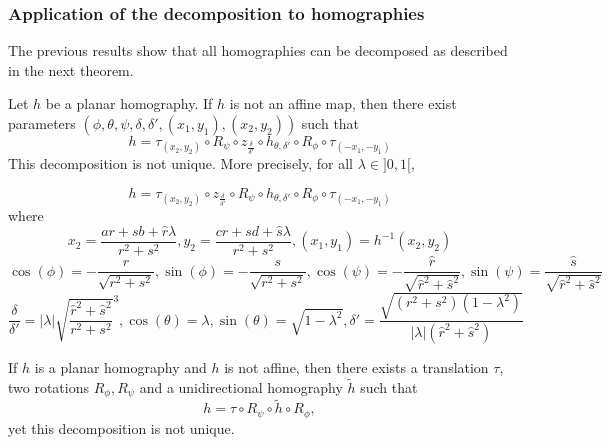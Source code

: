\subsubsection{Application of the decomposition to homographies}
The previous results show that all homographies can be decomposed as described in the next theorem.

\begin{thm}
Let $h$ be a planar homography. If $h$ is not an affine map, then there exist parameters $(\phi,\theta,\psi,\delta,\delta',(x_1,y_1),(x_2,y_2))$ such that
\begin{equation*}
h = \tau_{(x_2,y_2)} \circ R_{\psi} \circ z_{\frac{\delta}{\delta'}} \circ h_{\theta,\delta'} \circ R_{\phi} \circ \tau_{(-x_1,-y_1)}
\end{equation*}
This decomposition is not unique. More precisely, for all $\lambda \in ]0,1[$,

  \begin{equation*}
h = \tau_{(x_2,y_2)} \circ z_{\frac{\delta}{\delta'}}  \circ R_{\psi} \circ h_{\theta,\delta'} \circ R_{\phi} \circ \tau_{(-x_1,-y_1)}
  \end{equation*}
  where 
 \begin{equation*}
x_2=\frac{ar+sb+\hat r \lambda}{r^2 +s^2}, y_2=\frac{cr+sd+\hat s \lambda}{r^2 +s^2}, (x_1 , y_1) = h^{-1}(x_{2},y_{2})
  \end{equation*}
 \begin{equation*}
 \cos( \phi )= - \frac{r}{\sqrt{r^2 + s^2}}, \sin( \phi )= - \frac{s}{\sqrt{r^2 + s^2}},\cos( \psi ) =- \frac{\hat r}{\sqrt{\hat r^2 + \hat s^2}}, \sin( \psi ) = \frac{\hat s}{\sqrt{\hat r^2 + \hat s^2}}
 \end{equation*}
 \begin{equation*}
 \frac{\delta}{\delta'}=|\lambda|\sqrt{\frac{\hat r^2 + \hat s^2}{r^2 + s^2}}^{3}, \cos(\theta)=\lambda, \sin(\theta)=\sqrt{1-\lambda^2}, \delta'=  \frac{\sqrt{(r^2 + s^2)(1-\lambda^2)}}{|\lambda| (\hat r^2+\hat s^2)}
 \end{equation*}
\label{thepropdecomp}
\end{thm}

\begin{corollaire} If $h$ is a planar homography and $h$ is not affine, then there exists a translation $\tau$, two rotations $R_\phi ,R_\psi$ and a unidirectional homography $\tilde{h}$ such that
\begin{equation}
h=\tau \circ R_\psi \circ \tilde{h} \circ R_\phi,
\label{formule_decomposition_effective}
\end{equation}
yet this decomposition is not unique.
\end{corollaire}

